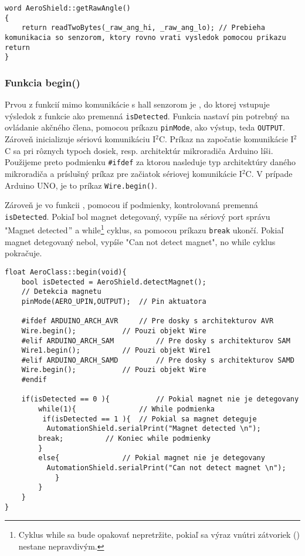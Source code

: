 \begin{lstlisting}[caption={Zdrojový kód funkcie getRawAngle.},captionpos=b]
word AeroShield::getRawAngle() 
{
	return readTwoBytes(_raw_ang_hi, _raw_ang_lo); // Prebieha komunikacia so senzorom, ktory rovno vrati vysledok pomocou prikazu return 
}
\end{lstlisting}

\subsubsection{Funkcia begin()}

Prvou z funkcií mimo komunikácie s hall senzorom je , do ktorej vstupuje výsledok z funkcie  ako premenná \verb|isDetected|. Funkcia  nastaví pin potrebný na ovládanie akčného člena, pomocou príkazu \verb|pinMode|, ako výstup, teda \verb|OUTPUT|. Zároveň inicializuje sériovú komunikáciu I$^{2}$C. Príkaz na započatie komunikácie I$^{2}$C sa pri rôznych typoch dosiek, resp. architektúr mikroradiča Arduino líši. Použijeme preto podmienku \verb|#ifdef| za ktorou nasleduje typ architektúry daného mikroradiča a príslušný príkaz pre začiatok sériovej komunikácie I$^{2}$C. V prípade Arduino UNO, je to príkaz \verb|Wire.begin()|. 

Zároveň je vo funkcii , pomocou if podmienky, kontrolovaná premenná \verb|isDetected|. Pokiaľ bol magnet detegovaný, vypíše na sériový port správu "Magnet detected$"$ a while\footnote[8]{Cyklus while sa bude opakovať nepretržite, pokiaľ sa výraz vnútri zátvoriek () nestane nepravdivým.} cyklus, sa pomocou príkazu \verb|break| ukončí. Pokiaľ magnet detegovaný nebol, vypíše "Can not detect magnet", no while cyklus pokračuje.  


\begin{lstlisting}[caption={Zdrojový kód funkcie begin.},captionpos=b]
float AeroClass::begin(void){                       
	bool isDetected = AeroShield.detectMagnet(); 
	// Detekcia magnetu 
	pinMode(AERO_UPIN,OUTPUT);	// Pin aktuatora
	
	#ifdef ARDUINO_ARCH_AVR		// Pre dosky s architekturov AVR
	Wire.begin();			// Pouzi objekt Wire
	#elif ARDUINO_ARCH_SAM      	// Pre dosky s architekturov SAM
	Wire1.begin();			// Pouzi objekt Wire1
	#elif ARDUINO_ARCH_SAMD     	// Pre dosky s architekturov SAMD
	Wire.begin();			// Pouzi objekt Wire
	#endif
	
	if(isDetected == 0 ){       	// Pokial magnet nie je detegovany
		while(1){               // While podmienka
		 if(isDetected == 1 ){	// Pokial sa magnet deteguje
		  AutomationShield.serialPrint("Magnet detected \n");	
		break;		    // Koniec while podmienky
		}
		else{               // Pokial magnet nie je detegovany
		  AutomationShield.serialPrint("Can not detect magnet \n");
			}
		}
	}       
} 
\end{lstlisting}

